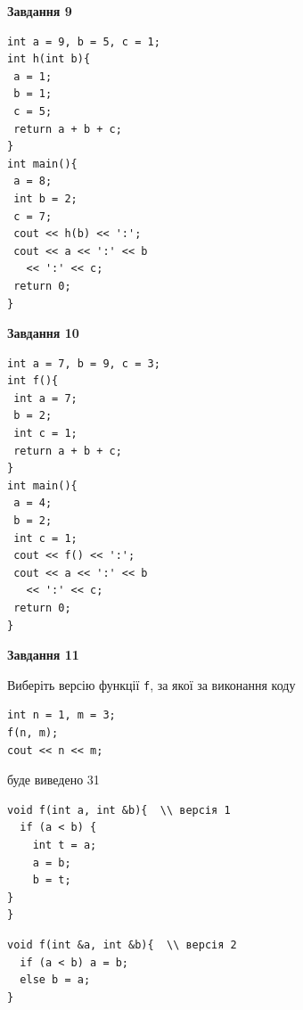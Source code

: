 \documentclass[12pt, ukrainian]{article}
\def\code#1{\Verb!#1!}
\begin{document}
{\begin {large}
\begin{minipage}[t]{11.0cm}
\end{minipage}


\begin{minipage}[t]{7.0cm}

\begin{center}
\textbf{Завдання 9}
\end{center}
\vspace{-8mm}

\begin{verbatim}
int a = 9, b = 5, c = 1;
int h(int b){
 a = 1;
 b = 1;
 c = 5;
 return a + b + c;
}
int main(){
 a = 8;
 int b = 2;
 c = 7;
 cout << h(b) << ':';
 cout << a << ':' << b 
   << ':' << c;
 return 0;
}
\end{verbatim}



\begin{center}
\textbf{Завдання 10}
\end{center}
\vspace{-8mm}

\begin{verbatim}
int a = 7, b = 9, c = 3;
int f(){
 int a = 7;
 b = 2;
 int c = 1;
 return a + b + c;
}
int main(){
 a = 4;
 b = 2;
 int c = 1;
 cout << f() << ':';
 cout << a << ':' << b 
   << ':' << c;
 return 0;
}
\end{verbatim}

\end{minipage}
\vline \hspace{1mm}
\begin{minipage}[t]{11.0cm}

\begin{center}
\textbf{Завдання 11}
\end{center}
Виберіть версію функції \code{f}, за якої за виконання коду
\begin{verbatim}
int n = 1, m = 3;
f(n, m);
cout << n << m;
\end{verbatim}

буде виведено 31

\begin{verbatim}
void f(int a, int &b){  \\ версія 1
  if (a < b) {
    int t = a;
    a = b;
    b = t;
}  
}
\end{verbatim}

\vspace{-8mm}\begin{verbatim}
void f(int &a, int &b){  \\ версія 2
  if (a < b) a = b;
  else b = a;
}
\end{verbatim}


\end{minipage}
\end{large}}
\end{document}

